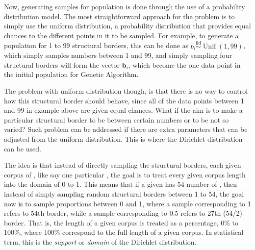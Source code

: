 Now, generating samples for population is done through the use of a probability distribution model. The most straightforward approach for the problem is to simply use the uniform distribution, a probability distribution that provides equal chances to the different points in it to be sampled. For example, to generate a population for 1 to 99 structural borders, this can be done as $b_i\overset{\text{iid}}{\sim}\operatorname{Unif}(1,99)$, which simply samples numbers between 1 and 99, and simply sampling four structural borders will form the vector $\mathbf{b}_i$, which become the one data point in the initial population for Genetic Algorithm.

The problem with uniform distribution though, is that there is no way to control how this structural border should behave, since all of the data points between 1 and 99 in example above are given equal chances. What if the aim is to make a particular structural border to be between certain numbers or to be not so varied? Such problem can be addressed if there are extra parameters that can be adjusted from the uniform distribution. This is where the Dirichlet distribution can be used.

The idea is that instead of directly sampling the structural borders, each given corpus of  , like say one particular  , the goal is to treat every given corpus length into the domain of 0 to 1. This means that if a given   has 54 number of  , then instead of simply sampling random structural borders between 1 to 54, the goal now is to sample proportions between 0 and 1, where a sample corresponding to 1 refers to 54th border, while a sample corresponding to 0.5 refers to 27th (54/2) border. That is, the length of a given corpus is treated as a percentage, 0\% to 100\%, where 100\% correspond to the full length of a given corpus. In statistical term, this is the \textit{support} or \textit{domain} of the Dirichlet distribution.


